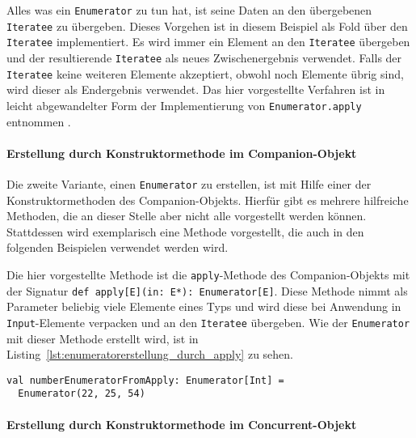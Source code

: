 Alles was ein \lstinline|Enumerator| zu tun hat, ist seine Daten an den übergebenen \lstinline|Iteratee| zu übergeben.
Dieses Vorgehen ist in diesem Beispiel als Fold über den \lstinline|Iteratee| implementiert.
Es wird immer ein Element an den \lstinline|Iteratee| übergeben und der resultierende \lstinline|Iteratee| als neues Zwischenergebnis verwendet.
Falls der \lstinline|Iteratee| keine weiteren Elemente akzeptiert, obwohl noch Elemente übrig sind, wird dieser als Endergebnis verwendet.
Das hier vorgestellte Verfahren ist in leicht abgewandelter Form der Implementierung von \lstinline|Enumerator.apply| entnommen \cite[vgl.][Z.~611 und Z.~654]{play_enumerator_source_code}.


\paragraph{Erstellung durch Konstruktormethode im Companion-Objekt} %
\label{par:erstellung_durch_konstruktormethode_im_companion-object}\mbox{} %

Die zweite Variante, einen \lstinline|Enumerator| zu erstellen, ist mit Hilfe einer der Konstruktormethoden des Companion-Objekts.
Hierfür gibt es mehrere hilfreiche Methoden, die an dieser Stelle aber nicht alle vorgestellt werden können.
Stattdessen wird exemplarisch eine Methode vorgestellt, die auch in den folgenden Beispielen verwendet werden wird.

Die hier vorgestellte Methode ist die \lstinline|apply|-Methode des Companion-Objekts mit der Signatur \lstinline[breaklines=true]|def apply[E](in: E*): Enumerator[E]|.
Diese Methode nimmt als Parameter beliebig viele Elemente eines Typs und wird diese bei Anwendung in \lstinline|Input|-Elemente verpacken und an den \lstinline|Iteratee| übergeben.
Wie der \lstinline|Enumerator| mit dieser Methode erstellt wird, ist in Listing~\ref{lst:enumeratorerstellung_durch_apply} zu sehen.

\begin{lstlisting}[caption=Erstellung eines Enumerators durch die apply-Konstruktormethode, label=lst:enumeratorerstellung_durch_apply]
val numberEnumeratorFromApply: Enumerator[Int] =
  Enumerator(22, 25, 54)
\end{lstlisting}


\paragraph{Erstellung durch Konstruktormethode im Concurrent-Objekt} %
\label{par:erstellung_durch_konstruktormethode_im_concurrent_objekt}\mbox{} %

